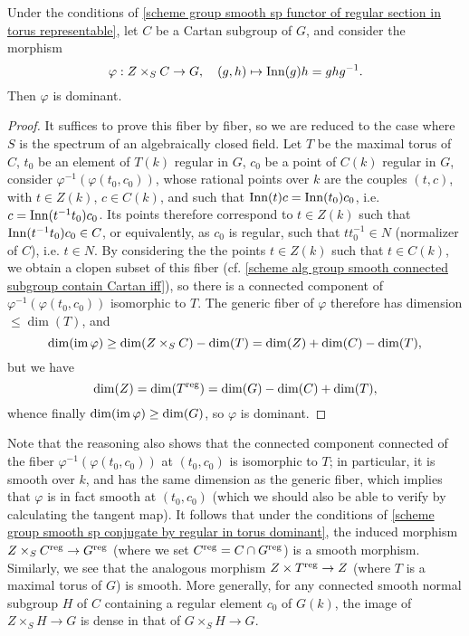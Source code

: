 \begin{corollary}\label{scheme group smooth sp conjugate by regular in torus dominant}
Under the conditions of \cref{scheme group smooth sp functor of regular section in torus representable}, let $C$ be a Cartan subgroup of $G$, and consider the morphism
\[\varphi:Z\times_SC\to G,\quad (g,h)\mapsto\mathrm{Inn}(g)h=ghg^{-1}.\]
Then $\varphi$ is dominant.
\end{corollary}
\begin{proof}
It suffices to prove this fiber by fiber, so we are reduced to the case where $S$ is the spectrum of an algebraically closed field. Let $T$ be the maximal torus of $C$, $t_0$ be an element of $T(k)$ regular in $G$, $c_0$ be a point of $C(k)$ regular in $G$, consider $\varphi^{-1}(\varphi(t_0,c_0))$, whose rational points over $k$ are the couples $(t,c)$, with $t\in Z(k)$, $c\in C(k)$, and such that $\mathrm{Inn}(t)c=\mathrm{Inn}(t_0)c_0$, i.e. $c=\mathrm{Inn}(t^{-1}t_0)c_0$. Its points therefore correspond to $t\in Z(k)$ such that $\mathrm{Inn}(t^{-1}t_0)c_0\in C$, or equivalently, as $c_0$ is regular, such that $tt_0^{-1}\in N$ (normalizer of $C$), i.e. $t\in N$. By considering the the points $t\in Z(k)$ such that $t\in C(k)$, we obtain a clopen subset of this fiber (cf. \cref{scheme alg group smooth connected subgroup contain Cartan iff}), so there is a connected component of $\varphi^{-1}(\varphi(t_0,c_0))$ isomorphic to $T$. The generic fiber of $\varphi$ therefore has dimension $\leq\dim(T)$, and
\[\dim(\operatorname{im}\varphi)\geq\dim(Z\times_SC)-\dim(T)=\dim(Z)+\dim(C)-\dim(T),\]
but we have
\[\dim(Z)=\dim(T^{\mathrm{reg}})=\dim(G)-\dim(C)+\dim(T),\]
whence finally $\dim(\operatorname{im}\varphi)\geq\dim(G)$, so $\varphi$ is dominant. 
\end{proof}

\begin{remark}
Note that the reasoning also shows that the connected component connected of the fiber $\varphi^{-1}(\varphi(t_0,c_0))$ at $(t_0,c_0)$ is isomorphic to $T$; in particular, it is smooth over $k$, and has the same dimension as the generic fiber, which implies that $\varphi$ is in fact smooth at $(t_0,c_0)$ (which we should also be able to verify by calculating the tangent map). It follows that under the conditions of \cref{scheme group smooth sp conjugate by regular in torus dominant}, the induced morphism $Z\times_SC^{\mathrm{reg}}\to G^{\mathrm{reg}}$ (where we set $C^{\mathrm{reg}}=C\cap G^{\mathrm{reg}}$) is a smooth morphism. Similarly, we see that the analogous morphism $Z\times T^{\mathrm{reg}}\to Z$ (where $T$ is a maximal torus of $G$) is smooth. More generally, for any connected smooth normal subgroup $H$ of $C$ containing a regular element $c_0$ of $G(k)$, the image of $Z\times_SH\to G$ is dense in that of $G\times_SH\to G$.
\end{remark}

